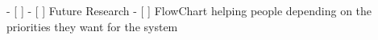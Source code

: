 - [ ]  
    - [ ]  Future Research
    - [ ]  FlowChart helping people depending on the priorities they want for the system